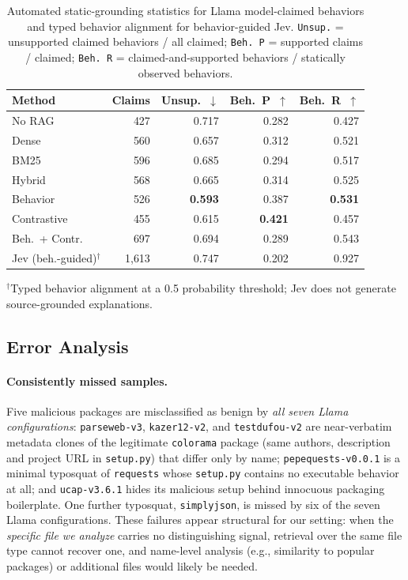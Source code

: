 \begin{table}[!ht]
    \caption{Automated static-grounding statistics for Llama model-claimed
    behaviors and typed behavior alignment for behavior-guided Jev. \texttt{Unsup.} =
    unsupported claimed behaviors / all claimed; \texttt{Beh.~P} = supported
    claims / claimed; \texttt{Beh.~R} = claimed-and-supported behaviors /
    statically observed behaviors.}
    \label{tab:faithfulness}
    \centering
    \setlength{\tabcolsep}{4pt}
    \begin{tabular}{lrrrr}
        \toprule
        \textbf{Method} & \textbf{Claims} & \textbf{Unsup.}~$\downarrow$ & \textbf{Beh.~P}~$\uparrow$ & \textbf{Beh.~R}~$\uparrow$ \\
        \midrule
        No RAG         & 427 & 0.717 & 0.282 & 0.427 \\
        Dense          & 560 & 0.657 & 0.312 & 0.521 \\
        BM25           & 596 & 0.685 & 0.294 & 0.517 \\
        Hybrid         & 568 & 0.665 & 0.314 & 0.525 \\
        Behavior       & 526 & \textbf{0.593} & 0.387 & \textbf{0.531} \\
        Contrastive    & 455 & 0.615 & \textbf{0.421} & 0.457 \\
        Beh.\ + Contr. & 697 & 0.694 & 0.289 & 0.543 \\
        \midrule
        Jev (beh.-guided)$^{\dagger}$ & 1{,}613 & 0.747 & 0.202 & 0.927 \\
        \bottomrule
    \end{tabular}
    \par\smallskip\footnotesize{$^{\dagger}$Typed behavior alignment at a 0.5
    probability threshold; Jev does not generate source-grounded explanations.}
\end{table}

\subsection{Error Analysis}
\label{sec:error-analysis}

\paragraph{Consistently missed samples.} Five malicious packages are
misclassified as benign by \emph{all seven Llama configurations}:
\texttt{parseweb-v3}, \texttt{kazer12-v2}, and \texttt{testdufou-v2} are
near-verbatim metadata clones of the legitimate \texttt{colorama} package
(same authors, description and project URL in \texttt{setup.py}) that differ
only by name; \texttt{pepequests-v0.0.1} is a minimal typosquat of
\texttt{requests} whose \texttt{setup.py} contains no executable behavior at
all; and \texttt{ucap-v3.6.1} hides its malicious setup behind innocuous
packaging boilerplate. One further typosquat, \texttt{simplyjson}, is missed
by six of the seven Llama configurations. These failures appear structural
for our setting: when the \emph{specific file we analyze} carries no
distinguishing signal, retrieval over the same file type cannot recover one,
and name-level analysis (e.g., similarity to popular packages) or additional
files would likely be needed.

